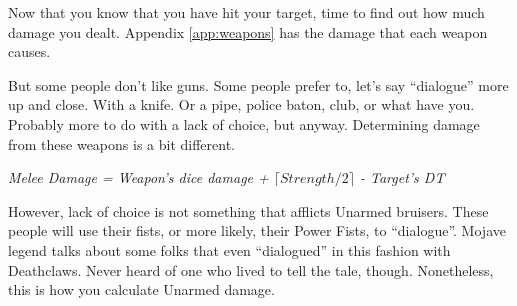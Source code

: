 \documentclass[11pt]{article} %
\let\oldlongtable\longtable
\let\endoldlongtable\endlongtable
\renewenvironment{longtable}{\rowcolors{2}{white}{Mojave}\oldlongtable} {
\endoldlongtable}
\begin{document}
Now that you know that you have hit your target, time to find out how much damage you dealt. Appendix \ref{app:weapons} has the damage that each weapon causes.
%
%
%

But some people don't like guns. Some people prefer to, let's say ``dialogue'' more up and close. With a knife. Or a pipe, police baton, club, or what have you. Probably more to do with a lack of choice, but anyway. Determining damage from these weapons is a bit different.        

\begin{center}
	\textit{Melee Damage = Weapon's dice damage + $\lceil Strength / 2 \rceil$ - Target's DT}
\end{center}

However, lack of choice is not something that afflicts Unarmed bruisers. These people will use their fists, or more likely, their Power Fists, to ``dialogue''. Mojave legend talks about some folks that even ``dialogued'' in this fashion with Deathclaws. Never heard of one who lived to tell the tale, though. Nonetheless, this is how you calculate Unarmed damage.
\end{document}
